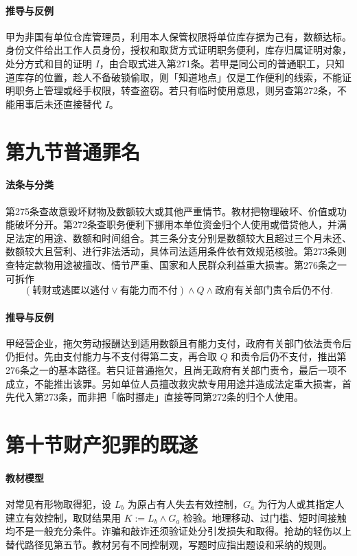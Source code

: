 \paragraph{推导与反例}
甲为非国有单位仓库管理员，利用本人保管权限将单位库存据为己有，数额达标。身份文件给出工作人员身份，授权和取货方式证明职务便利，库存归属证明对象，处分方式和目的证明 $I$，由合取式进入第271条。若甲是同公司的普通职工，只知道库存的位置，趁人不备破锁偷取，则「知道地点」仅是工作便利的线索，不能证明职务上管理或经手权限，转查盗窃。若只有临时使用意思，则另查第272条，不能用事后未还直接替代 $I$。

\section{第九节\quad 普通罪名}

\paragraph{法条与分类}
第275条查故意毁坏财物及数额较大或其他严重情节。教材把物理破坏、价值或功能破坏分开。第272条查职务便利下挪用本单位资金归个人使用或借贷他人，并满足法定的用途、数额和时间组合。其三条分支分别是数额较大且超过三个月未还、数额较大且营利、进行非法活动，具体司法适用条件依有效规范核验。第273条则查特定款物用途被擅改、情节严重、国家和人民群众利益重大损害。第276条之一可拆作
\[
 (\text{转财或逃匿以逃付}\lor\text{有能力而不付})
 \land Q\land\text{政府有关部门责令后仍不付}.
\]

\paragraph{推导与反例}
甲经营企业，拖欠劳动报酬达到适用数额且有能力支付，政府有关部门依法责令后仍拒付。先由支付能力与不支付得第二支，再合取 $Q$ 和责令后仍不支付，推出第276条之一的基本路径。若只证普通拖欠，且尚无政府有关部门责令，最后一项不成立，不能推出该罪。另如单位人员擅改救灾款专用用途并造成法定重大损害，首先代入第273条，而非把「临时挪走」直接等同第272条的归个人使用。

\section{第十节\quad 财产犯罪的既遂}

\paragraph{教材模型}
对常见有形物取得犯，设 $L_b$ 为原占有人失去有效控制，$G_a$ 为行为人或其指定人建立有效控制，取财结果用 $K:=L_b\land G_a$ 检验。地理移动、过门槛、短时间接触均不是一般充分条件。诈骗和敲诈还须验证处分引发损失和取得。抢劫的轻伤以上替代路径见第五节。教材另有不同控制观，写题时应指出题设和采纳的规则。

